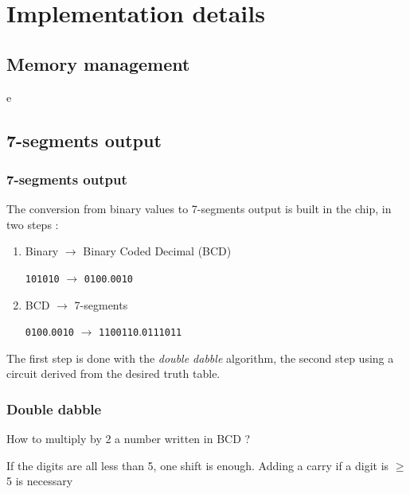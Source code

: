 \documentclass{beamer}
\begin{document}
\section{Implementation details}

\subsection{Memory management}

\begin{frame}
e
\end{frame}

\subsection{7-segments output}

\begin{frame}
\frametitle{7-segments output}
The conversion from binary values to 7-segments output is built in the chip, in two steps :
\begin{enumerate}
    \item Binary $\rightarrow$ Binary Coded Decimal (BCD)
        
          \texttt{101010} $\rightarrow$ \texttt{0100}.\texttt{0010}
    \item BCD $\rightarrow$ 7-segments

        \texttt{0100}.\texttt{0010} $\rightarrow$ \texttt{1100110}.\texttt{0111011}
\end{enumerate}

The first step is done with the \emph{double dabble} algorithm, the second step using a circuit derived
from the desired truth table.

\end{frame}

\begin{frame}
    \frametitle{Double dabble}

    How to multiply by 2 a number written in BCD ?

    If the digits are all less than 5, one shift is enough.
    Adding a carry if a digit is $\geq$ 5 is necessary
\end{frame}
\end{document}
